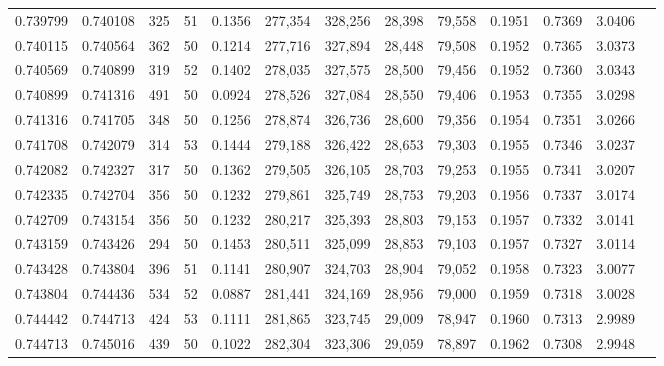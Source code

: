 \begin{tabular}{rrrrrrrrrrrrr}
0.739799 & 0.740108 &   325 &  51 &                                     0.1356 & 277,354 & 328,256 &  28,398 &  79,558 & 0.1951 & 0.7369 & 3.0406 \\
0.740115 & 0.740564 &   362 &  50 &                                     0.1214 & 277,716 & 327,894 &  28,448 &  79,508 & 0.1952 & 0.7365 & 3.0373 \\
0.740569 & 0.740899 &   319 &  52 &                                     0.1402 & 278,035 & 327,575 &  28,500 &  79,456 & 0.1952 & 0.7360 & 3.0343 \\
0.740899 & 0.741316 &   491 &  50 &                                     0.0924 & 278,526 & 327,084 &  28,550 &  79,406 & 0.1953 & 0.7355 & 3.0298 \\
0.741316 & 0.741705 &   348 &  50 &                                     0.1256 & 278,874 & 326,736 &  28,600 &  79,356 & 0.1954 & 0.7351 & 3.0266 \\
0.741708 & 0.742079 &   314 &  53 &                                     0.1444 & 279,188 & 326,422 &  28,653 &  79,303 & 0.1955 & 0.7346 & 3.0237 \\
0.742082 & 0.742327 &   317 &  50 &                                     0.1362 & 279,505 & 326,105 &  28,703 &  79,253 & 0.1955 & 0.7341 & 3.0207 \\
0.742335 & 0.742704 &   356 &  50 &                                     0.1232 & 279,861 & 325,749 &  28,753 &  79,203 & 0.1956 & 0.7337 & 3.0174 \\
0.742709 & 0.743154 &   356 &  50 &                                     0.1232 & 280,217 & 325,393 &  28,803 &  79,153 & 0.1957 & 0.7332 & 3.0141 \\
0.743159 & 0.743426 &   294 &  50 &                                     0.1453 & 280,511 & 325,099 &  28,853 &  79,103 & 0.1957 & 0.7327 & 3.0114 \\
0.743428 & 0.743804 &   396 &  51 &                                     0.1141 & 280,907 & 324,703 &  28,904 &  79,052 & 0.1958 & 0.7323 & 3.0077 \\
0.743804 & 0.744436 &   534 &  52 &                                     0.0887 & 281,441 & 324,169 &  28,956 &  79,000 & 0.1959 & 0.7318 & 3.0028 \\
0.744442 & 0.744713 &   424 &  53 &                                     0.1111 & 281,865 & 323,745 &  29,009 &  78,947 & 0.1960 & 0.7313 & 2.9989 \\
0.744713 & 0.745016 &   439 &  50 &                                     0.1022 & 282,304 & 323,306 &  29,059 &  78,897 & 0.1962 & 0.7308 & 2.9948 \\

\end{tabular}
